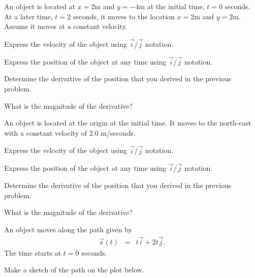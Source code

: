 
\begin{problem}
\item An object is located at $x=2$m and $y=-4$m at the initial time,
  $t=0$ seconds. At a later time, $t=2$ seconds, it moves to the
  location $x=2$m and $y=2$m. Assume it moves at a constant velocity.
  \begin{subproblem}
  \item Express the velocity of the object using $\vec{i}$/$\vec{j}$
    notation.  
    \vfill
  \item Express the position of the object at any time using
    $\vec{i}$/$\vec{j}$ notation.
    \vfill
  \item Determine the derivative of the position that you derived in
    the previous problem.
    \vfill
  \item What is the magnitude of the derivative?
    \vfill
  \end{subproblem}

  \clearpage

\item An object is located at the origin at the initial time. It moves
  to the north-east with a constant velocity of 2.0 m/seconds. 

  \begin{subproblem}
  \item Express the velocity of the object using $\vec{i}$/$\vec{j}$
    notation.  
    \vfill
  \item Express the position of the object at any time using
    $\vec{i}$/$\vec{j}$ notation.
    \vfill
  \item Determine the derivative of the position that you derived in
    the previous problem.
    \vfill
  \item What is the magnitude of the derivative?
    \vfill
  \end{subproblem}

  \clearpage

\item An object moves along the path given by
  \begin{eqnarray*}
    \vec{x}(t) & = & t \vec{i} + 2 t \vec{j}.
  \end{eqnarray*}
  The time starts at $t=0$ seconds.

  \begin{subproblem}
  \item Make a sketch of the path on the plot below.


\end{subproblem}
\end{problem}
